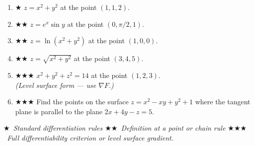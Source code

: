 \documentclass[12pt,a4paper]{article}
\newcommand{\easy}{{\color{green!60!black}$\bigstar$}}
\newcommand{\medium}{{\color{orange}$\bigstar\bigstar$}}
\newcommand{\hard}{{\color{red}$\bigstar\bigstar\bigstar$}}
\begin{document}
\begin{enumerate}[leftmargin=*, label=(\alph*)]

\item \easy\quad
$z = x^2+y^2$ at the point $(1,1,2)$.

\item \medium\quad
$z = e^x\sin y$ at the point $(0,\pi/2,1)$.

\item \medium\quad
$z = \ln(x^2+y^2)$ at the point $(1,0,0)$.

\item \medium\quad
$z = \sqrt{x^2+y^2}$ at the point $(3,4,5)$.

\item \hard\quad
$x^2+y^2+z^2 = 14$ at the point $(1,2,3)$.\\
\emph{(Level surface form --- use $\nabla F$.)}

\item \hard\quad
Find the points on the surface $z = x^2 - xy + y^2 + 1$ where the tangent plane
is parallel to the plane $2x + 4y - z = 5$.

\end{enumerate}

\bigskip
\begin{center}
\small\itshape
\easy\ Standard differentiation rules\quad
\medium\ Definition at a point or chain rule\quad
\hard\ Full differentiability criterion or level surface gradient.
\end{center}
\end{document}
